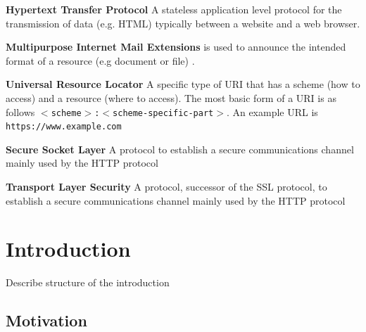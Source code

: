 \documentclass{mscreport}
\begin{document}
\begin{hangparas}{.25in}{1}
\textbf{Hypertext Transfer Protocol} A stateless application level protocol \cite{Berners-Lee1996-ji} for the transmission of data (e.g. HTML) typically between a website and a web browser. \par
\vspace{0.5cm}
\textbf{Multipurpose Internet Mail Extensions} is used to announce the intended format of a resource (e.g document or file) \cite{Freed2013-yn}. \par
\vspace{0.5cm}
\textbf{Universal Resource Locator} A specific type of URI that has a scheme (how to access) and a resource (where to access). The most basic form of a URI is as follows \texttt{$<$scheme$>$:$<$scheme-specific-part$>$}. An example URL is \texttt{https://www.example.com} \par
\vspace{0.5cm}
\textbf{Secure Socket Layer} A protocol to establish a secure communications channel mainly used by the HTTP protocol \par
\vspace{0.5cm}
\textbf{Transport Layer Security} A protocol, successor of the SSL protocol, to establish a secure communications channel mainly used by the HTTP protocol \par

\end{hangparas}



\newpage

\listoffigures

\newpage
{}
\listoftables

\newpage




\tableofcontents

\newpage

\section{Introduction}

Describe structure of the introduction

\subsection{Motivation}
\end{document}
